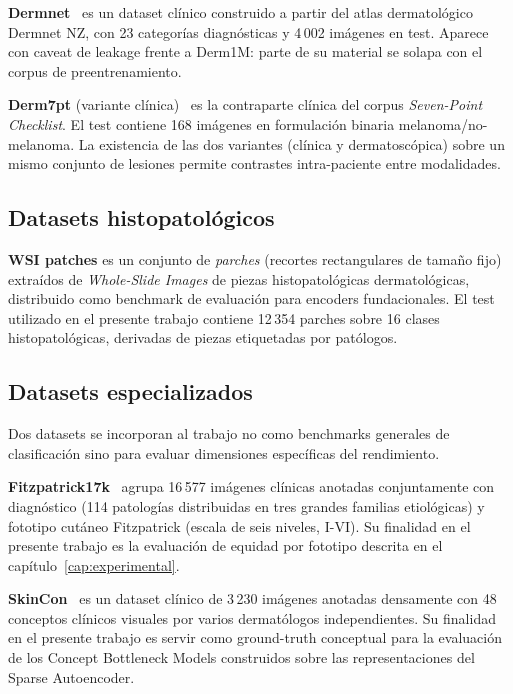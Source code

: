 \textbf{Dermnet}~\cite{dermnet} es un dataset clínico construido a
partir del atlas dermatológico Dermnet NZ, con 23 categorías
diagnósticas y 4\,002 imágenes en test. Aparece con caveat de
leakage frente a Derm1M: parte de su material se solapa con el corpus
de preentrenamiento.

\textbf{Derm7pt} (variante clínica)~\cite{kawahara2019} es la
contraparte clínica del corpus \emph{Seven-Point Checklist}. El test
contiene 168 imágenes en formulación binaria melanoma/no-melanoma.
La existencia de las dos variantes (clínica y dermatoscópica) sobre
un mismo conjunto de lesiones permite contrastes intra-paciente
entre modalidades.

\subsection{Datasets histopatológicos}
\label{sec:datasets-histo}

\textbf{WSI patches} es un conjunto de \emph{parches} (recortes
rectangulares de tamaño fijo) extraídos de \emph{Whole-Slide Images}
de piezas histopatológicas dermatológicas, distribuido como benchmark
de evaluación para encoders fundacionales. El test utilizado en el
presente trabajo contiene 12\,354 parches sobre 16 clases
histopatológicas, derivadas de piezas etiquetadas por patólogos.

\subsection{Datasets especializados}
\label{sec:datasets-especiales}

Dos datasets se incorporan al trabajo no como benchmarks generales de
clasificación sino para evaluar dimensiones específicas del
rendimiento.

\textbf{Fitzpatrick17k}~\cite{fitzpatrick17k} agrupa 16\,577 imágenes
clínicas anotadas conjuntamente con diagnóstico (114 patologías
distribuidas en tres grandes familias etiológicas) y fototipo cutáneo
Fitzpatrick (escala de seis niveles, I-VI). Su finalidad en el
presente trabajo es la evaluación de equidad por fototipo descrita en
el capítulo~\ref{cap:experimental}.

\textbf{SkinCon}~\cite{skincon} es un dataset clínico de 3\,230
imágenes anotadas densamente con 48 conceptos clínicos visuales por
varios dermatólogos independientes. Su finalidad en el presente
trabajo es servir como ground-truth conceptual para la evaluación de
los Concept Bottleneck Models construidos sobre las representaciones
del Sparse Autoencoder.

